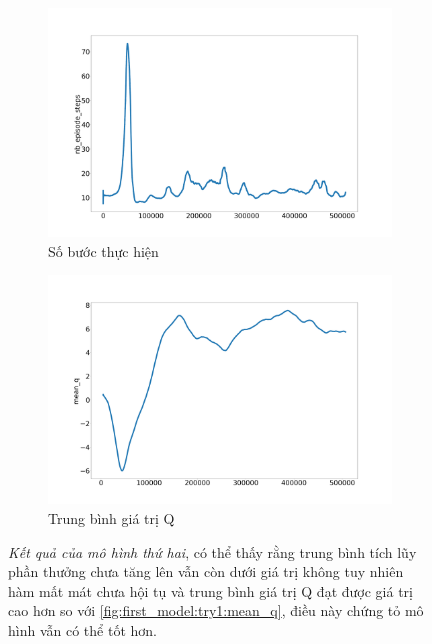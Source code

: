 \begin{figure}[ht]
\begin{subfigure}{.5\textwidth}
      \includegraphics[width=1.1\textwidth]{Pic/Second_model/nb_episode_steps.png}
      \caption{Số bước thực hiện}
      \label{fig:resut_second_model:step}
    \end{subfigure}%
    \begin{subfigure}{.5\textwidth}
      \includegraphics[width=1.1\textwidth]{Pic/Second_model/mean_q.png}  
      \caption{Trung bình giá trị Q}
      \label{fig:resut_second_model:mean_q}
    \end{subfigure}
\caption[Kết quả của mô hình thứ hai]{\textit{Kết quả của mô hình thứ hai}, có thể thấy rằng trung bình tích lũy phần thưởng chưa tăng lên vẫn còn dưới giá trị không tuy nhiên hàm mất mát chưa hội tụ và trung bình giá trị Q đạt được giá trị cao hơn so với \ref{fig:first_model:try1:mean_q}, điều này chứng tỏ mô hình vẫn có thể tốt hơn.}
\label{fig:resut_second_model}
\end{figure}
\newpage